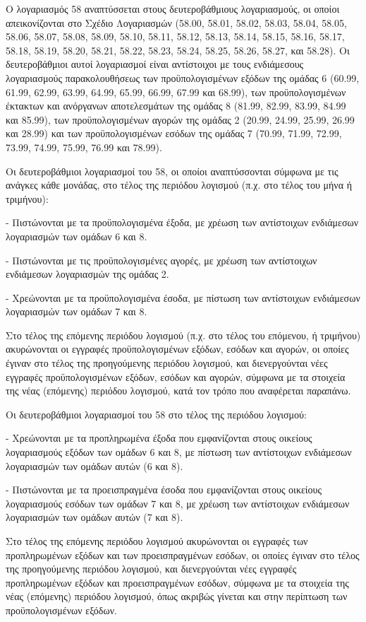 \documentclass[A4,10pt,greek]{book}
\begin{document}
Ο λογαριασμός 58 αναπτύσσεται στους δευτεροβάθμιους λογαριασμούς, οι οποίοι απεικονίζονται στο Σχέδιο Λογαριασμών (58.00, 58.01, 58.02, 58.03, 58.04, 58.05, 58.06, 58.07, 58.08, 58.09, 58.10, 58.11, 58.12, 58.13, 58.14, 58.15, 58.16, 58.17, 58.18, 58.19, 58.20, 58.21, 58.22, 58.23, 58.24, 58.25, 58.26, 58.27, και 58.28). Οι δευτεροβάθμιοι αυτοί λογαριασμοί είναι αντίστοιχοι με τους ενδιάμεσους λογαριασμούς παρακολουθήσεως των προϋπολογισμένων εξόδων της ομάδας 6 (60.99, 61.99, 62.99, 63.99, 64.99, 65.99, 66.99, 67.99 και 68.99), των προϋπολογισμένων έκτακτων και ανόργανων αποτελεσμάτων της ομάδας 8 (81.99, 82.99, 83.99, 84.99 και 85.99), των προϋπολογισμένων αγορών της ομάδας 2 (20.99, 24.99, 25.99, 26.99 και 28.99) και των προϋπολογισμένων εσόδων της ομάδας 7 (70.99, 71.99, 72.99, 73.99, 74.99, 75.99, 76.99 και 78.99).

Οι δευτεροβάθμιοι λογαριασμοί του 58, οι οποίοι αναπτύσσονται σύμφωνα με τις ανάγκες κάθε μονάδας, στο τέλος της περιόδου λογισμού (π.χ. στο τέλος του μήνα ή τριμήνου):

- Πιστώνονται με τα προϋπολογισμένα έξοδα, με χρέωση των αντίστοιχων ενδιάμεσων λογαριασμών των ομάδων 6 και 8.

- Πιστώνονται με τις προϋπολογισμένες αγορές, με χρέωση των αντίστοιχων ενδιάμεσων λογαριασμών της ομάδας 2.

- Χρεώνονται με τα προϋπολογισμένα έσοδα, με πίστωση των αντίστοιχων ενδιάμεσων λογαριασμών των ομάδων 7 και 8.

Στο τέλος της επόμενης περιόδου λογισμού (π.χ. στο τέλος του επόμενου, ή τριμήνου) ακυρώνονται οι εγγραφές προϋπολογισμένων εξόδων, εσόδων και αγορών, οι οποίες έγιναν στο τέλος της προηγούμενης περιόδου λογισμού, και διενεργούνται νέες εγγραφές προϋπολογισμένων εξόδων, εσόδων και αγορών, σύμφωνα με τα στοιχεία της νέας (επόμενης) περιόδου λογισμού, κατά τον τρόπο που αναφέρεται παραπάνω.

Οι δευτεροβάθμιοι λογαριασμοί του 58 στο τέλος της περιόδου λογισμού:

- Χρεώνονται με τα προπληρωμένα έξοδα που εμφανίζονται στους οικείους λογαριασμούς εξόδων των ομάδων 6 και 8, με πίστωση των αντίστοιχων ενδιάμεσων λογαριασμών των ομάδων αυτών (6 και 8).

- Πιστώνονται με τα προεισπραγμένα έσοδα που εμφανίζονται στους οικείους λογαριασμούς εσόδων των ομάδων 7 και 8, με χρέωση των αντίστοιχων ενδιάμεσων λογαριασμών των ομάδων αυτών (7 και 8).

Στο τέλος της επόμενης περιόδου λογισμού ακυρώνονται οι εγγραφές των προπληρωμένων εξόδων και των προεισπραγμένων εσόδων, οι οποίες έγιναν στο τέλος της προηγούμενης περιόδου λογισμού, και διενεργούνται νέες εγγραφές προπληρωμένων εξόδων και προεισπραγμένων εσόδων, σύμφωνα με τα στοιχεία της νέας (επόμενης) περιόδου λογισμού, όπως ακριβώς γίνεται και στην περίπτωση των προϋπολογισμένων εξόδων.
\end{document}
